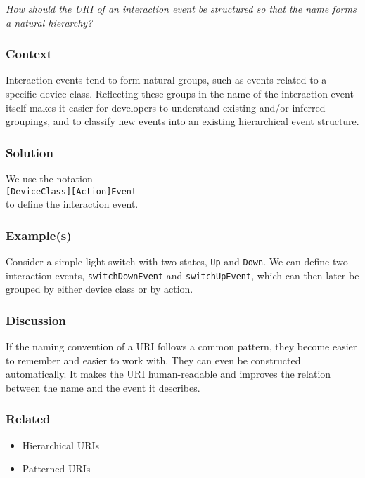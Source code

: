 \emph{How should the \ac{URI} of an interaction event be structured so that the name forms a natural hierarchy?}

\subsubsection{Context}

Interaction events tend to form natural groups, such as events related to a specific device class. Reflecting these groups in the name of the interaction event itself makes it easier for developers to understand existing and/or inferred groupings, and to classify new events into an existing hierarchical event structure.

\subsubsection{Solution}

We use the notation\\ 

\noindent
\texttt{[DeviceClass][Action]Event}\\

 to define the interaction event. 

\subsubsection{Example(s)}

Consider a simple light switch with two states, \texttt{Up} and \texttt{Down}. We can define two interaction events, \texttt{switchDownEvent} and \texttt{switchUpEvent}, which can then later be grouped by either device class or by action.

\subsubsection{Discussion}

If the naming convention of a \ac{URI} follows a common pattern, they become easier to remember and easier to work with. They can even be constructed automatically. It makes the \ac{URI} human-readable and improves the relation between the name and the event it describes. 

\subsubsection{Related}

\begin{itemize}
	\item Hierarchical URIs \cite{Dodds2011}
	\item Patterned URIs \cite{Dodds2011}
\end{itemize}





